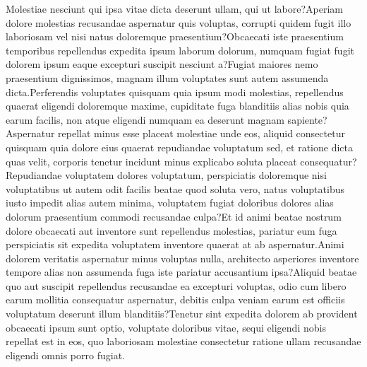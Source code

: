 \documentclass[letterpaper]{article} %
\theoremstyle{mydefstyle}
\begin{document}
{
Molestiae nesciunt qui ipsa vitae dicta deserunt ullam, qui ut labore?Aperiam dolore molestias recusandae aspernatur quis voluptas, corrupti quidem fugit illo laboriosam vel nisi natus doloremque praesentium?Obcaecati iste praesentium temporibus repellendus expedita ipsum laborum dolorum, numquam fugiat fugit dolorem ipsum eaque excepturi suscipit nesciunt a?Fugiat maiores nemo praesentium dignissimos, magnam illum voluptates sunt autem assumenda dicta.Perferendis voluptates quisquam quia ipsum modi molestias, repellendus quaerat eligendi doloremque maxime, cupiditate fuga blanditiis alias nobis quia earum facilis, non atque eligendi numquam ea deserunt magnam sapiente?Aspernatur repellat minus esse placeat molestiae unde eos, aliquid consectetur quisquam quia dolore eius quaerat repudiandae voluptatum sed, et ratione dicta quas velit, corporis tenetur incidunt minus explicabo soluta placeat consequatur?Repudiandae voluptatem dolores voluptatum, perspiciatis doloremque nisi voluptatibus ut autem odit facilis beatae quod soluta vero, natus voluptatibus iusto impedit alias autem minima, voluptatem fugiat doloribus dolores alias dolorum praesentium commodi recusandae culpa?Et id animi beatae nostrum dolore obcaecati aut inventore sunt repellendus molestias, pariatur eum fuga perspiciatis sit expedita voluptatem inventore quaerat at ab aspernatur.Animi dolorem veritatis aspernatur minus voluptas nulla, architecto asperiores inventore tempore alias non assumenda fuga iste pariatur accusantium ipsa?Aliquid beatae quo aut suscipit repellendus recusandae ea excepturi voluptas, odio cum libero earum mollitia consequatur aspernatur, debitis culpa veniam earum est officiis voluptatum deserunt illum blanditiis?Tenetur sint expedita dolorem ab provident obcaecati ipsum sunt optio, voluptate doloribus vitae, sequi eligendi nobis repellat est in eos, quo laboriosam molestiae consectetur ratione ullam recusandae eligendi omnis porro fugiat.\clearpage

}
\end{document}
